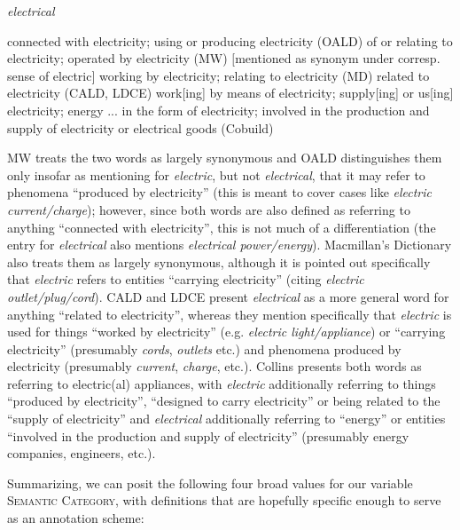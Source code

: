 \begin{exe}
\ex \textit{electrical}
\begin{xlist} 
\label{ex:definitionelectrical}
\ex connected with electricity; using or producing electricity (OALD)
\ex of or relating to electricity; operated by electricity (MW) $[$mentioned as synonym under corresp. sense of electric$]$
\ex working by electricity; relating to electricity (MD)
\ex related to electricity (CALD, LDCE)
\ex work[ing] by means of electricity; supply[ing] or us[ing] electricity; energy ... in the form of electricity; involved in the production and supply of electricity or electrical goods (Cobuild)
\end{xlist}
\end{exe}

MW treats the two words as largely synonymous and OALD distinguishes them only insofar as mentioning for \textit{electric}, but not \textit{electrical}, that it may refer to phenomena ``produced by electricity'' (this is meant to cover cases like \textit{electric current/charge}); however, since both words are also defined as referring to anything ``connected with electricity'', this is not much of a differentiation (the entry for \textit{electrical} also mentions \textit{electrical power/energy}). Macmillan's Dictionary also treats them as largely synonymous, although it is pointed out specifically that \textit{electric} refers to entities ``carrying electricity'' (citing \textit{electric outlet/plug/cord}). CALD and LDCE present \textit{electrical} as a more general word for anything ``related to electricity'', whereas they mention specifically that \textit{electric} is used for things ``worked by electricity'' (e.g. \textit{electric light/appliance}) or ``carrying electricity'' (presumably \textit{cords}, \textit{outlets} etc.) and phenomena produced by electricity (presumably \textit{current}, \textit{charge}, etc.). Collins presents both words as referring to electric(al) appliances, with \textit{electric} additionally referring to things ``produced by electricity'', ``designed to carry electricity'' or being related to the ``supply of electricity'' and \textit{electrical} additionally referring to ``energy'' or entities ``involved in the production and supply of electricity'' (presumably energy companies, engineers, etc.).

Summarizing, we can posit the following four broad values for our variable \textsc{Semantic Category}, with definitions that are hopefully specific enough to serve as an annotation scheme:

